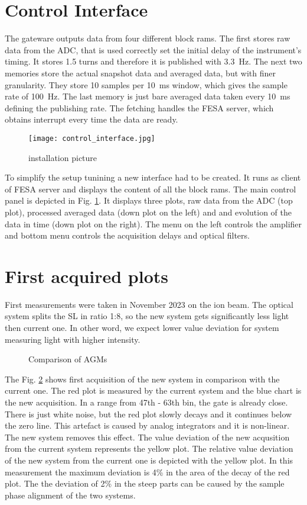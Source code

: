 \section{Control Interface}
The gateware outputs data from four different block rams. The first stores raw
data from the ADC, that is used correctly set the initial delay of the
instrument's timing. It stores 1.5 turns and therefore it is published with
\SI{3.3}{Hz}. The next two memories store the actual snapshot data and averaged
data, but with finer granularity. They store 10 samples per \SI{10}{ms} window,
which gives the sample rate of \SI{100}{Hz}. The last memory is just bare
averaged data taken every \SI{10}{ms} defining the publishing rate. The
fetching handles the FESA server, which obtains interrupt every time the data
are ready. 
\begin{figure}[!tbh]
    \centering
    \texttt{[image: control\_interface.jpg]}
    \caption{installation picture}
    \label{fig:control_interface}
\end{figure}
To simplify the setup tunining a new interface had to be created. It runs as
client of FESA server and displays the content of all the block rams. The main
control panel is depicted in Fig. \ref{fig:control_interface}. It displays
three plots, raw data from the ADC (top plot), processed averaged data (down
plot on the left) and and evolution of the data in time (down plot on the
right). The menu on the left controls the amplifier and bottom menu controls
the acquisition delays and optical filters.   

\section{First acquired plots}
First measurements were taken in November 2023 on the ion beam. The
optical system splits the SL in ratio 1:8, so the new system gets
significantly less light then current one. In other word, we expect
lower value deviation for system measuring light with higher intensity.  
\begin{figure}[!htb]
    \begin{center}
        \scalebox{0.54}{}
        \caption{Comparison of AGMs}
        \label{fig:comparison_chart}
    \end{center}
\end{figure}
The Fig. \ref{fig:comparison_chart} shows first acquisition of the new system
in comparison with the current one. The red plot is measured by the current
system and the blue chart is the new acquisition. In a range from 47th - 63th
bin, the gate is already close. There is just white noise, but the red plot
slowly decays and it continues below the zero line. This artefact is caused by
analog integrators and it is non-linear. The new system removes this effect.
The value deviation of the new acqusition from the current system represents
the yellow plot.   The relative value deviation of the new system from the
current one is depicted with the yellow plot. In this measurement the maximum
deviation is 4\% in the area of the decay of the red plot. The the deviation of
2\% in the steep parts can be caused by the sample phase alignment of the two
systems.   

